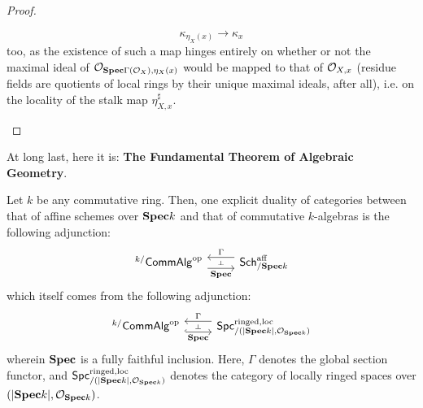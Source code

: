 \begin{proof}
\begin{enumerate}
                                $$\kappa_{\eta_X(x)} \to \kappa_x$$
                            too, as the existence of such a map hinges entirely on whether or not the maximal ideal of $\mathcal{O}_{\mathbf{Spec} \Gamma(\mathcal{O}_X), \eta_X(x)}$ would be mapped to that of $\mathcal{O}_{X, x}$ (residue fields are quotients of local rings by their unique maximal ideals, after all), i.e. on the locality of the stalk map $\eta_{X, x}^{\sharp}$. 
                        \end{enumerate}
                    \end{proof}
                
                At long last, here it is: \textbf{The Fundamental Theorem of Algebraic Geometry}.
                \begin{theorem} \label{theorem: fundamental_adjunction}
                    Let $k$ be any commutative ring. Then, one explicit duality of categories between that of affine schemes over $\mathbf{Spec} k$ and that of commutative $k$-algebras is the following adjunction:
                        $$
                            \begin{tikzcd}
                            	{{}^{k/}\Comm\Alg^{\op}} & {\Sch^{\aff}_{/\Spec k}}
                            	\arrow[""{name=0, anchor=center, inner sep=0}, "\Spec"', shift right=2, from=1-1, to=1-2]
                            	\arrow[""{name=1, anchor=center, inner sep=0}, "\Gamma"', shift right=2, from=1-2, to=1-1]
                            	\arrow["\dashv"{anchor=center, rotate=-90}, draw=none, from=1, to=0]
                            \end{tikzcd}
                        $$
                    which itself comes from the following adjunction:
                        $$
                            \begin{tikzcd}
                            	{{}^{k/}\Comm\Alg^{\op}} & {\Spc^{\ringed, \loc}_{/(|\Spec k|, \calO_{\Spec k})}}
                            	\arrow[""{name=0, anchor=center, inner sep=0}, "\Spec"', shift right=2, from=1-1, to=1-2, hook]
                            	\arrow[""{name=1, anchor=center, inner sep=0}, "\Gamma"', shift right=2, from=1-2, to=1-1]
                            	\arrow["\dashv"{anchor=center, rotate=-90}, draw=none, from=1, to=0]
                            \end{tikzcd}
                        $$
                    wherein $\mathbf{Spec}$ is a fully faithful inclusion. Here, $\Gamma$ denotes the global section functor, and $\mathsf{Spc}^{\mathrm{ringed}, \mathrm{loc}}_{/(|\mathbf{Spec} k|, \mathcal{O}_{\mathbf{Spec} k})}$ denotes the category of locally ringed spaces over $(|\mathbf{Spec} k|, \mathcal{O}_{\mathbf{Spec} k})$.  
                \end{theorem}
